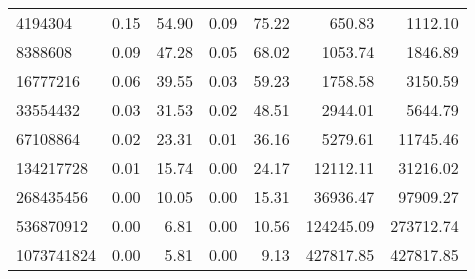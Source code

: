 \begin{tabular}{lrrrrrr}
4194304    &        0.15 &         54.90 &           0.09 &        75.22 &           650.83 &         1112.10 \\
8388608    &        0.09 &         47.28 &           0.05 &        68.02 &          1053.74 &         1846.89 \\
16777216   &        0.06 &         39.55 &           0.03 &        59.23 &          1758.58 &         3150.59 \\
33554432   &        0.03 &         31.53 &           0.02 &        48.51 &          2944.01 &         5644.79 \\
67108864   &        0.02 &         23.31 &           0.01 &        36.16 &          5279.61 &        11745.46 \\
134217728  &        0.01 &         15.74 &           0.00 &        24.17 &         12112.11 &        31216.02 \\
268435456  &        0.00 &         10.05 &           0.00 &        15.31 &         36936.47 &        97909.27 \\
536870912  &        0.00 &          6.81 &           0.00 &        10.56 &        124245.09 &       273712.74 \\
1073741824 &        0.00 &          5.81 &           0.00 &         9.13 &        427817.85 &       427817.85 \\
\bottomrule
\end{tabular}

